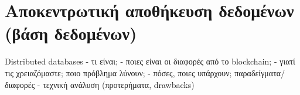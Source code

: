 \section{Αποκεντρωτική αποθήκευση δεδομένων (βάση δεδομένων)}

Distributed databases
    - τι είναι;
    - ποιες είναι οι διαφορές από το blockchain;
    - γιατί τις χρειαζόμαστε; ποιο πρόβλημα λύνουν;
    - πόσες, ποιες υπάρχουν; παραδείγματα/διαφορές
    - τεχνική ανάλυση (προτερήματα, drawbacks)
